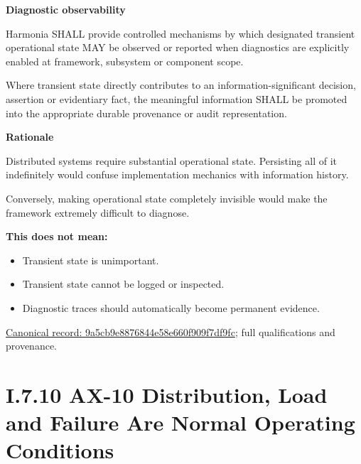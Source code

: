 \par\medskip\textbf{Diagnostic observability}\par


Harmonia SHALL provide controlled mechanisms by which designated
transient operational state MAY be observed or reported when diagnostics
are explicitly enabled at framework, subsystem or component scope.



Where transient state directly contributes to an information-significant
decision, assertion or evidentiary fact, the meaningful information
SHALL be promoted into the appropriate durable provenance or audit
representation.



\par\medskip\textbf{Rationale}\par


Distributed systems require substantial operational state. Persisting
all of it indefinitely would confuse implementation mechanics with
information history.



Conversely, making operational state completely invisible would make the
framework extremely difficult to diagnose.



\textbf{This does not mean:}



\begin{itemize}


\item Transient state is unimportant.

\item Transient state cannot be logged or inspected.

\item Diagnostic traces should automatically become permanent evidence.

\end{itemize}

{\footnotesize \href{../../../../../../../continuum/motivation/principle/9a5cb9e8876844e58e660f909f7df9fc.md}{Canonical record: 9a5cb9e8876844e58e660f909f7df9fc}; full qualifications and provenance.}\par
\section*{I.7.10 AX-10 Distribution, Load and Failure Are Normal Operating Conditions}
\label{navigation:I.7.10}

